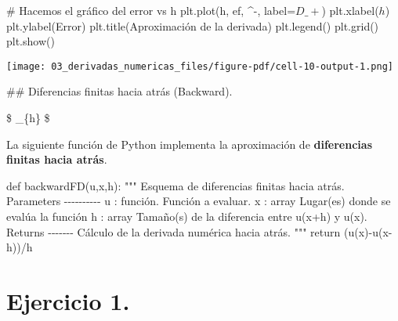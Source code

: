 \documentclass[
  letterpaper,
  DIV=11,
  numbers=noendperiod]{scrreprt}
\newenvironment{Shaded}{\begin{snugshade}}{\end{snugshade}}
\newcommand{\CommentTok}[1]{\textcolor[rgb]{0.37,0.37,0.37}{#1}}
\newcommand{\ControlFlowTok}[1]{\textcolor[rgb]{0.00,0.23,0.31}{#1}}
\newcommand{\KeywordTok}[1]{\textcolor[rgb]{0.00,0.23,0.31}{#1}}
\newcommand{\NormalTok}[1]{\textcolor[rgb]{0.00,0.23,0.31}{#1}}
\newcommand{\OperatorTok}[1]{\textcolor[rgb]{0.37,0.37,0.37}{#1}}
\newcommand{\StringTok}[1]{\textcolor[rgb]{0.13,0.47,0.30}{#1}}
\begin{document}
\begin{Shaded}
\begin{Highlighting}[]
\CommentTok{\# Hacemos el gráfico del error vs h}
\NormalTok{plt.plot(h, ef, }\StringTok{\textquotesingle{}\^{}{-}\textquotesingle{}}\NormalTok{, label}\OperatorTok{=}\StringTok{\textquotesingle{}$D\_+$\textquotesingle{}}\NormalTok{)}
\NormalTok{plt.xlabel(}\StringTok{\textquotesingle{}$h$\textquotesingle{}}\NormalTok{)}
\NormalTok{plt.ylabel(}\StringTok{\textquotesingle{}Error\textquotesingle{}}\NormalTok{)}
\NormalTok{plt.title(}\StringTok{\textquotesingle{}Aproximación de la derivada\textquotesingle{}}\NormalTok{)}
\NormalTok{plt.legend()}
\NormalTok{plt.grid()}
\NormalTok{plt.show()}
\end{Highlighting}
\end{Shaded}

\texttt{[image: 03\_derivadas\_numericas\_files/figure-pdf/cell-10-output-1.png]}

\#\# Diferencias finitas hacia atrás (Backward).

\$ \displaystyle {}
\approx \lim\limits\_\{h\}  \$

La siguiente función de Python implementa la aproximación de
\textbf{diferencias finitas hacia atrás}.

\begin{Shaded}
\begin{Highlighting}[]
\KeywordTok{def}\NormalTok{ backwardFD(u,x,h):}
    \CommentTok{""" }
\CommentTok{    Esquema de diferencias finitas hacia atrás.}
\CommentTok{    }
\CommentTok{    Parameters}
\CommentTok{    {-}{-}{-}{-}{-}{-}{-}{-}{-}{-}}
\CommentTok{    u : función. }
\CommentTok{    Función a evaluar.}
\CommentTok{    }
\CommentTok{    x : array}
\CommentTok{    Lugar(es) donde se evalúa la función}
\CommentTok{    }
\CommentTok{    h : array}
\CommentTok{    Tamaño(s) de la diferencia entre u(x+h) y u(x).}
\CommentTok{    }
\CommentTok{    Returns}
\CommentTok{    {-}{-}{-}{-}{-}{-}{-}}
\CommentTok{    Cálculo de la derivada numérica hacia atrás.}
\CommentTok{    """}
    \ControlFlowTok{return}\NormalTok{ (u(x)}\OperatorTok{{-}}\NormalTok{u(x}\OperatorTok{{-}}\NormalTok{h))}\OperatorTok{/}\NormalTok{h}
\end{Highlighting}
\end{Shaded}

\section{Ejercicio 1.}\label{ejercicio-1.-1}
\end{document}
